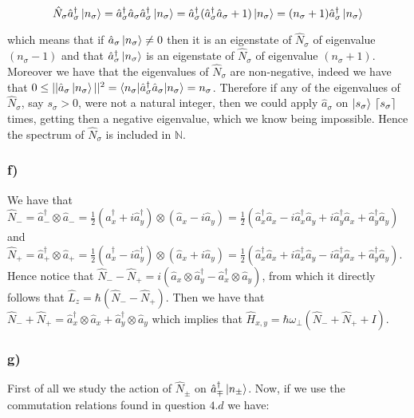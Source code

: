 \documentclass[10pt,a4paper]{book}
\DeclarePairedDelimiter{\ceil}{\lceil}{\rceil}
\begin{document}
$$\hat{N}_{\sigma}\hat{a}_{\sigma}^{\dagger}\ket{n_{\sigma}}=\hat{a}_{\sigma}^{\dagger}\hat{a}_{\sigma}\hat{a}_{\sigma}^{\dagger}\ket{n_{\sigma}}=\hat{a}_{\sigma}^{\dagger}(\hat{a}_{\sigma}^{\dagger}\hat{a}_{\sigma}+1)\ket{n_{\sigma}}=(n_{\sigma}+1)\hat{a}_{\sigma}^{\dagger}\ket{n_{\sigma}}$$

which means that if $\hat{a}_{\sigma}\ket{n_{\sigma}}\neq 0$ then it is an eigenstate of $\hat{N}_{\sigma}$ of eigenvalue $(n_{\sigma}-1)$ and that $\hat{a}_{\sigma}^{\dagger}\ket{n_{\sigma}}$ is an eigenstate of $\hat{N}_{\sigma}$ of eigenvalue $(n_{\sigma}+1)$. Moreover we have that the eigenvalues of $\hat{N}_{\sigma}$ are non-negative, indeed we have that $0\leq ||\hat{a}_{\sigma}\ket{n_{\sigma}}||^2=\braket{n_{\sigma}|\hat{a}_{\sigma}^{\dagger}\hat{a}_{\sigma}|n_{\sigma}}=n_{\sigma}$. Therefore if any of the eigenvalues of $\hat{N}_{\sigma}$, say $s_{\sigma}>0$, were not a natural integer, then we could apply $\hat{a}_{\sigma}$ on $\ket{s_{\sigma}}$ $\ceil*{s_{\sigma}}$ times, getting then a negative eigenvalue, which we know being impossible. Hence the spectrum of $\hat{N}_{\sigma}$ is included in $\mathbb{N}$.


\subsubsection{f)}

We have that $\hat{N}_-=\hat{a}_-^{\dagger}\otimes \hat{a}_-=\frac{1}{2}(\hat{a}_x^{\dagger}+i\hat{a}_y^{\dagger})\otimes(\hat{a}_x-i\hat{a}_y)=\frac{1}{2}(\hat{a}_x^{\dagger}\hat{a}_x-i\hat{a}_x^{\dagger}\hat{a}_y+i\hat{a}_y^{\dagger}\hat{a}_x+\hat{a}_y^{\dagger}\hat{a}_y)$ and
$\hat{N}_+=\hat{a}_+^{\dagger}\otimes\hat{a}_+=\frac{1}{2}(\hat{a}_x^{\dagger}-i\hat{a}_y^{\dagger})\otimes (\hat{a}_x+i\hat{a}_y)=\frac{1}{2}(\hat{a}_x^{\dagger}\hat{a}_x+i\hat{a}_x^{\dagger}\hat{a}_y-i\hat{a}_y^{\dagger}\hat{a}_x+\hat{a}_y^{\dagger}\hat{a}_y)$.
Hence notice that $\hat{N}_--\hat{N}_+=i(\hat{a}_x\otimes\hat{a}_y^{\dagger}-\hat{a}_x^{\dagger}\otimes\hat{a}_y)$, from which it directly follows that $\hat{L}_z=\hbar(\hat{N}_--\hat{N}_+)$. Then we have that $\hat{N}_-+\hat{N}_+=\hat{a}_x^{\dagger}\otimes \hat{a}_x+\hat{a}_y^{\dagger}\otimes \hat{a}_y$ which implies that $\hat{H}_{x,y}=\hbar\omega_{\perp}(\hat{N}_-+\hat{N}_++I)$.

\subsubsection*{g)}
First of all we study the action of $\hat{N}_{\pm}$ on $\hat{a}_{\mp}^{\dagger}\ket{n_{\pm}}$.  Now, if we use the commutation relations found in question $4.d$ we have:
\end{document}
